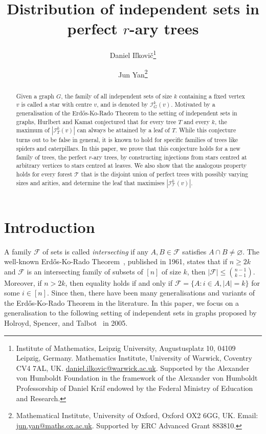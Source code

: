 \documentclass[11pt]{article}
\title{Distribution of independent sets in perfect $r$-ary trees}
\author{Daniel I\v{l}kovi\v{c}\thanks{Institute of Mathematics, Leipzig University, Augustusplatz 10, 04109 Leipzig, Germany. Mathematics Institute, University of Warwick, Coventry CV4 7AL, UK. \url{daniel.ilkovic@warwick.ac.uk}. Supported by the Alexander von Humboldt Foundation in the framework of the Alexander von Humboldt Professorship of Daniel Krá\v{l} endowed by the Federal Ministry of Education and Research.} \and Jun Yan\thanks{Mathematical Institute, University of Oxford, Oxford OX2 6GG, UK. Email: \url{jun.yan@maths.ox.ac.uk}. Supported by
ERC Advanced Grant 883810.}}
\theoremstyle{definition}
\newcommand{\cI}{\mathcal{I}}
\begin{document}
\maketitle

\begin{abstract}
Given a graph $G$, the family of all independent sets of size $k$ containing a fixed vertex $v$ is called a star with centre $v$, and is denoted by $\cI_G^k(v)$. Motivated by a generalisation of the Erd\H{o}s-Ko-Rado Theorem to the setting of independent sets in graphs, Hurlbert and Kamat conjectured that for every tree $T$ and every $k$, the maximum of $|\cI_T^k(v)|$ can always be attained by a leaf of $T$. While this conjecture turns out to be false in general, it is known to hold for specific families of trees like spiders and caterpillars. In this paper, we prove that this conjecture holds for a new family of trees, the perfect $r$-ary trees, by constructing injections from stars centred at arbitrary vertices to stars centred at leaves. We also show that the analogous property holds for every forest $\mathcal{T}$ that is the disjoint union of perfect trees with possibly varying sizes and arities, and determine the leaf that maximises $|\cI_{\mathcal{T}}^k(v)|$. 

\end{abstract}

\section{Introduction}
A family $\mathcal{F}$ of sets is called \textit{intersecting} if any $A,B\in\mathcal{F}$ satisfies $A\cap B\not=\varnothing$. The well-known Erd\H os-Ko-Rado Theorem~\cite{EKR}, published in 1961, states that if $n\geq2k$ and $\mathcal{F}$ is an intersecting family of subsets of $[n]$ of size $k$, then $|\mathcal{F}|\leq\binom{n-1}{k-1}$. Moreover, if $n>2k$, then equality holds if and only if $\mathcal{F}=\{A:i\in A, |A|=k\}$ for some $i\in[n]$. Since then, there have been many generalisations and variants of the Erd\H os-Ko-Rado Theorem in the literature. In this paper, we focus on a generalisation to the following setting of independent sets in graphs proposed by Holroyd, Spencer, and Talbot~\cite{HST,HT} in 2005. 
\end{document}
